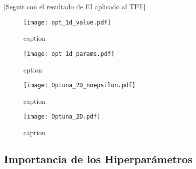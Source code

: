 [Seguir con el resultado de EI aplicado al TPE]
 


 




\begin{figure}[h!]
\centering
\texttt{[image: opt\_1d\_value.pdf]}
\caption{caption }
\label{fig:optuna_1_value}
\end{figure}

  

\begin{figure}[h!]
\centering
\texttt{[image: opt\_1d\_params.pdf]}
\caption{cption }
\label{fig:optuna_1_params}
\end{figure}



\begin{figure}[p!]
\centering
\texttt{[image: Optuna\_2D\_noepsilon.pdf]}
\caption{caption }
\label{fig:optuna_2d}
\end{figure}

\begin{figure}[p!]
\centering
\texttt{[image: Optuna\_2D.pdf]}
\caption{caption }
\label{fig:optuna_2d}
\end{figure}



\subsection{Importancia de los Hiperparámetros}